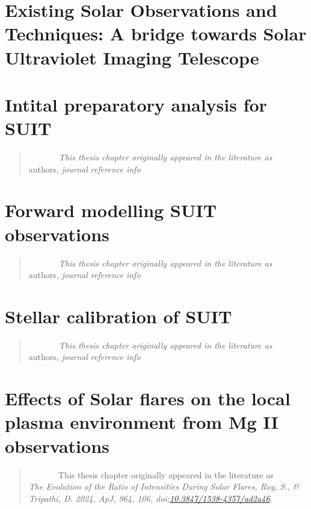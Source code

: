 \documentclass[plain]{hvdthesis}
\begin{document}
\chapter{Existing Solar Observations and Techniques: A bridge towards Solar Ultraviolet Imaging Telescope}\label{c:chap2}

\clearpage
%
\chapter{Intital preparatory analysis for SUIT}\label{c:chap3}
\begin{quote}
{\em ~~~~~~~This thesis chapter originally appeared in the literature as} \\
{authors,
{\em journal reference info}}
\end{quote}

\clearpage
%
\chapter{Forward modelling SUIT observations}\label{c:chap4}
\begin{quote}
{\em ~~~~~~~This thesis chapter originally appeared in the literature as} \\
{authors,
{\em journal reference info}}
\end{quote}

%
\chapter{Stellar calibration of SUIT}\label{c:chap5}
\begin{quote}
{\em ~~~~~~~This thesis chapter originally appeared in the literature as} \\
{authors,
{\em journal reference info}}
\end{quote}

%
\chapter{Effects of Solar flares on the local plasma environment from Mg II observations}\label{c:chap6}
\begin{quote}
{ ~~~~~~~This thesis chapter originally appeared in the literature as} \\
{{\em The Evolution of the Ratio of  Intensities During Solar Flares, Roy, S., \& Tripathi, D. 2024, ApJ, 964, 106, doi:\href{https://iopscience.iop.org/article/10.3847/1538-4357/ad2a46}{10.3847/1538-4357/ad2a46}}.}
\end{quote}

\clearpage
%
\end{document}
